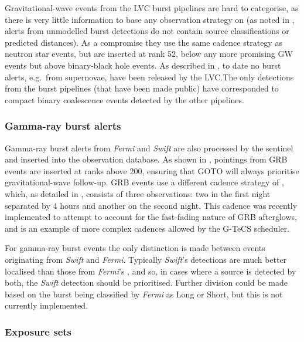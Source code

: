 \begin{colsection}
Gravitational-wave events from the LVC burst pipelines \citep{GW_burst} are hard to categorise, as there is very little information to base any observation strategy on (as noted in , alerts from unmodelled burst detections do not contain source classifications or predicted distances). As a compromise they use the same cadence strategy as neutron star events, but are inserted at rank 52, below any more promising GW events but above binary-black hole events. As described in , to date no burst alerts, e.g.\ from supernovae, have been released by the LVC.\@ The only detections from the burst pipelines (that have been made public) have corresponded to compact binary coalescence events detected by the other pipelines.

\subsubsection{Gamma-ray burst alerts}

Gamma-ray burst alerts from \textit{Fermi} and \textit{Swift} are also processed by the sentinel and inserted into the observation database. As shown in , pointings from GRB events are inserted at ranks above 200, ensuring that GOTO will always prioritise gravitational-wave follow-up. GRB events use a different cadence strategy of , which, as detailed in , consists of three observations: two in the first night separated by 4 hours and another on the second night. This cadence was recently implemented to attempt to account for the fast-fading nature of GRB afterglows, and is an example of more complex cadences allowed by the G-TeCS scheduler.

For gamma-ray burst events the only distinction is made between events originating from \textit{Swift} and \textit{Fermi}. Typically \textit{Swift}'s  detections are much better localised than those from \textit{Fermi}'s , and so, in cases where a source is detected by both, the \textit{Swift} detection should be prioritised. Further division could be made based on the burst being classified by \textit{Fermi} as Long or Short, but this is not currently implemented.

\subsubsection{Exposure sets}


\end{colsection}
